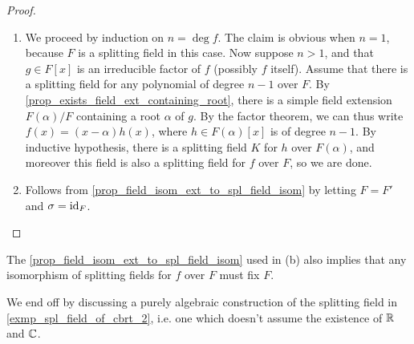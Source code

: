 \begin{proof}~
    \begin{enumerate}[label=(\alph*)]
        \item We proceed by induction on $n = \deg{f}$. The claim is obvious when $n = 1$, because $F$ is a splitting field in this case. Now suppose $n > 1$, and that $g \in F[x]$ is an irreducible factor of $f$ (possibly $f$ itself). Assume that there is a splitting field for any polynomial of degree $n - 1$ over $F$. By \cref{prop_exists_field_ext_containing_root}, there is a simple field extension $F(\alpha)/F$ containing a root $\alpha$ of $g$. By the factor theorem, we can thus write $f(x) = (x - \alpha) h(x)$, where $h \in F(\alpha)[x]$ is of degree $n - 1$. By inductive hypothesis, there is a splitting field $K$ for $h$ over $F(\alpha)$, and moreover this field is also a splitting field for $f$ over $F$, so we are done.
        \item Follows from \cref{prop_field_isom_ext_to_spl_field_isom} by letting $F = F'$ and $\sigma = \operatorname{id}_F$. \qedhere
    \end{enumerate}
\end{proof}

\begin{remark}
\label{rem_spl_field_isom_fixes_base}
    The \cref{prop_field_isom_ext_to_spl_field_isom} used in (b) also implies that any isomorphism of splitting fields for $f$ over $F$ must fix $F$.
\end{remark}

We end off by discussing a purely algebraic construction of the splitting field in \cref{exmp_spl_field_of_cbrt_2}, i.e. one which doesn't assume the existence of $\mathbb{{R}}$ and $\mathbb{{C}}$.

